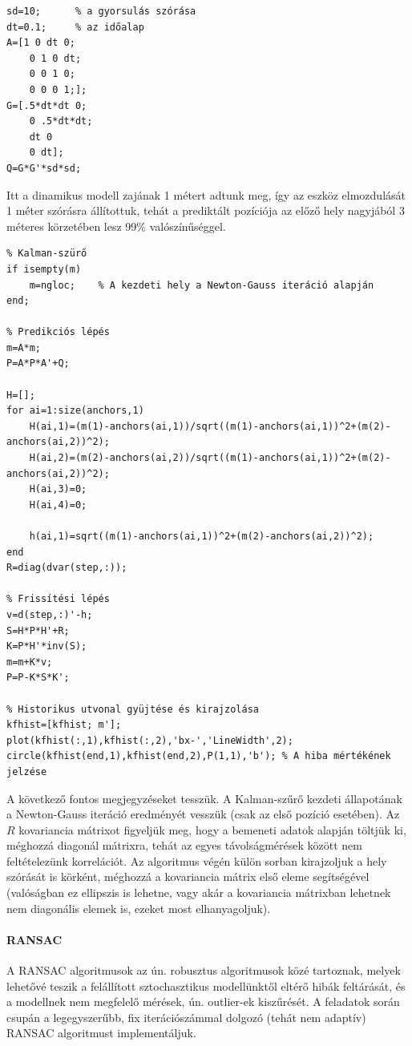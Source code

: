 \begin{answer}
\begin{lstlisting}
sd=10;		% a gyorsulás szórása
dt=0.1;		% az időalap
A=[1 0 dt 0;
	0 1 0 dt;
	0 0 1 0;
	0 0 0 1;];
G=[.5*dt*dt 0;
	0 .5*dt*dt;
	dt 0
	0 dt];
Q=G*G'*sd*sd;
	\end{lstlisting}
	Itt a dinamikus modell zajának 1 métert adtunk meg, így az eszköz elmozdulását 1 méter szórásra állítottuk, tehát a prediktált pozíciója az előző hely nagyjából 3 méteres körzetében lesz 99\% valószínűséggel.
	\begin{lstlisting}
% Kalman-szürő  
if isempty(m)
	m=ngloc;	% A kezdeti hely a Newton-Gauss iteráció alapján
end;

% Predikciós lépés
m=A*m;
P=A*P*A'+Q;

H=[];
for ai=1:size(anchors,1)
	H(ai,1)=(m(1)-anchors(ai,1))/sqrt((m(1)-anchors(ai,1))^2+(m(2)-anchors(ai,2))^2);
	H(ai,2)=(m(2)-anchors(ai,2))/sqrt((m(1)-anchors(ai,1))^2+(m(2)-anchors(ai,2))^2);
	H(ai,3)=0;
	H(ai,4)=0;
	
	h(ai,1)=sqrt((m(1)-anchors(ai,1))^2+(m(2)-anchors(ai,2))^2);
end
R=diag(dvar(step,:));

% Frissítési lépés
v=d(step,:)'-h;
S=H*P*H'+R;
K=P*H'*inv(S);
m=m+K*v;
P=P-K*S*K';

% Historikus utvonal gyüjtése és kirajzolása
kfhist=[kfhist; m'];
plot(kfhist(:,1),kfhist(:,2),'bx-','LineWidth',2);
circle(kfhist(end,1),kfhist(end,2),P(1,1),'b');	% A hiba mértékének jelzése
	\end{lstlisting}
	A következő fontos megjegyzéseket tesszük. A Kalman-szűrő kezdeti állapotának a Newton-Gauss iteráció eredményét vesszük (csak az első pozíció esetében). Az $R$ kovariancia mátrixot figyeljük meg, hogy a bemeneti adatok alapján töltjük ki, méghozzá diagonál mátrixra, tehát az egyes távolságmérések között nem feltételezünk korrelációt. Az algoritmus végén külön sorban kirajzoljuk a hely szórását is körként, méghozzá a kovariancia mátrix első eleme segítségével (valóságban ez ellipszis is lehetne, vagy akár a kovariancia mátrixban lehetnek nem diagonális elemek is, ezeket most elhanyagoljuk).
	
	\paragraph{RANSAC}
	A RANSAC algoritmusok az ún. robusztus algoritmusok közé tartoznak, melyek lehetővé teszik a felállított sztochasztikus modellünktől eltérő hibák feltárását, és a modellnek nem megfelelő mérések, ún. outlier-ek kiszűrését. A feladatok során csupán a legegyszerűbb, fix iterációszámmal dolgozó (tehát nem adaptív) RANSAC algoritmust implementáljuk.
	

\end{answer}
